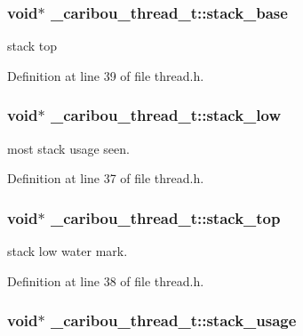 \hypertarget{struct__caribou__thread__t_a6e316e784c771be57958edcd9e95b8d9}{
\subsubsection[{stack\-\_\-base}]{\setlength{\rightskip}{0pt plus 5cm}void$\ast$ \-\_\-caribou\-\_\-thread\-\_\-t\-::stack\-\_\-base}}\label{struct__caribou__thread__t_a6e316e784c771be57958edcd9e95b8d9}


stack top 



Definition at line 39 of file thread.\-h.

\hypertarget{struct__caribou__thread__t_a09703c14662151cf8b073626e9144279}{
\subsubsection[{stack\-\_\-low}]{\setlength{\rightskip}{0pt plus 5cm}void$\ast$ \-\_\-caribou\-\_\-thread\-\_\-t\-::stack\-\_\-low}}\label{struct__caribou__thread__t_a09703c14662151cf8b073626e9144279}


most stack usage seen. 



Definition at line 37 of file thread.\-h.

\hypertarget{struct__caribou__thread__t_a82a114a6b3fb2c733159562ba9442eca}{
\subsubsection[{stack\-\_\-top}]{\setlength{\rightskip}{0pt plus 5cm}void$\ast$ \-\_\-caribou\-\_\-thread\-\_\-t\-::stack\-\_\-top}}\label{struct__caribou__thread__t_a82a114a6b3fb2c733159562ba9442eca}


stack low water mark. 



Definition at line 38 of file thread.\-h.

\hypertarget{struct__caribou__thread__t_af4ac7e484b60887e54aeff966cf366da}{
\subsubsection[{stack\-\_\-usage}]{\setlength{\rightskip}{0pt plus 5cm}void$\ast$ \-\_\-caribou\-\_\-thread\-\_\-t\-::stack\-\_\-usage}}\label{struct__caribou__thread__t_af4ac7e484b60887e54aeff966cf366da}


